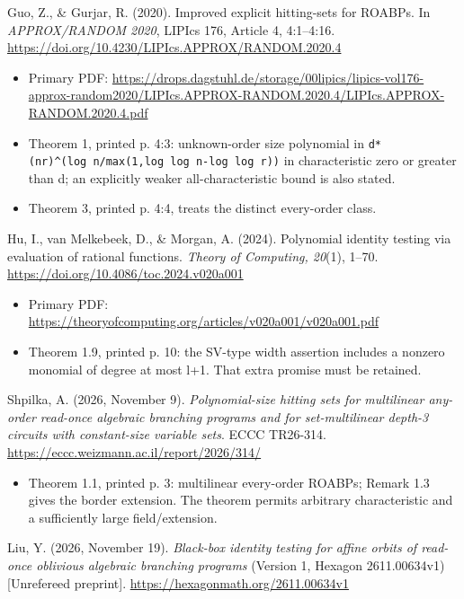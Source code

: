 \documentclass[11pt,a4paper]{article}
\providecommand{\tightlist}{\setlength{\itemsep}{0pt}\setlength{\parskip}{0pt}}
\theoremstyle{definition}\newtheorem{definition}{Definition}
\begin{document}
Guo, Z., \& Gurjar, R. (2020). Improved explicit hitting-sets for
ROABPs. In \emph{APPROX/RANDOM 2020}, LIPIcs 176, Article 4, 4:1--4:16.
\url{https://doi.org/10.4230/LIPIcs.APPROX/RANDOM.2020.4}

\begin{itemize}
\tightlist
\item
  Primary PDF:
  \url{https://drops.dagstuhl.de/storage/00lipics/lipics-vol176-approx-random2020/LIPIcs.APPROX-RANDOM.2020.4/LIPIcs.APPROX-RANDOM.2020.4.pdf}
\item
  Theorem 1, printed p. 4:3: unknown-order size polynomial in
  \texttt{d*(nr)\^{}(log\ n/max(1,log\ log\ n-log\ log\ r))} in
  characteristic zero or greater than d; an explicitly weaker
  all-characteristic bound is also stated.
\item
  Theorem 3, printed p. 4:4, treats the distinct every-order class.
\end{itemize}

Hu, I., van Melkebeek, D., \& Morgan, A. (2024). Polynomial identity
testing via evaluation of rational functions. \emph{Theory of Computing,
20}(1), 1--70. \url{https://doi.org/10.4086/toc.2024.v020a001}

\begin{itemize}
\tightlist
\item
  Primary PDF:
  \url{https://theoryofcomputing.org/articles/v020a001/v020a001.pdf}
\item
  Theorem 1.9, printed p. 10: the SV-type width assertion includes a
  nonzero monomial of degree at most l+1. That extra promise must be
  retained.
\end{itemize}

Shpilka, A. (2026, November 9). \emph{Polynomial-size hitting sets for
multilinear any-order read-once algebraic branching programs and for
set-multilinear depth-3 circuits with constant-size variable sets}. ECCC
TR26-314. \url{https://eccc.weizmann.ac.il/report/2026/314/}

\begin{itemize}
\tightlist
\item
  Theorem 1.1, printed p. 3: multilinear every-order ROABPs; Remark 1.3
  gives the border extension. The theorem permits arbitrary
  characteristic and a sufficiently large field/extension.
\end{itemize}

Liu, Y. (2026, November 19). \emph{Black-box identity testing for affine
orbits of read-once oblivious algebraic branching programs} (Version 1,
Hexagon 2611.00634v1) {[}Unrefereed preprint{]}.
\url{https://hexagonmath.org/2611.00634v1}
\end{document}

